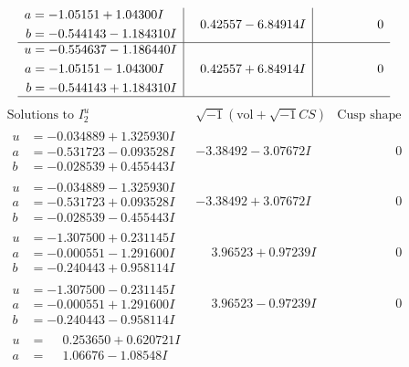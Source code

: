 \documentclass[1p]{elsarticle_modified}
\theoremstyle{definition}
\newcommand{\I}{\sqrt{-1}}
\begin{document}
$$\begin{array}{c|c|c}
\begin{aligned}
a &= -1.05151 + 1.04300 I \\
b &= -0.544143 - 1.184310 I\end{aligned}
 & \phantom{-}0.42557 - 6.84914 I & \phantom{-0.000000 } 0 \\ \hline\begin{aligned}
u &= -0.554637 - 1.186440 I \\
a &= -1.05151 - 1.04300 I \\
b &= -0.544143 + 1.184310 I\end{aligned}
 & \phantom{-}0.42557 + 6.84914 I & \phantom{-0.000000 } 0\\
 \hline 
 \end{array}$$\newpage$$\begin{array}{c|c|c}  
\text{Solutions to }I^u_{2}& \I (\text{vol} + \sqrt{-1}CS) & \text{Cusp shape}\\
 \hline 
\begin{aligned}
u &= -0.034889 + 1.325930 I \\
a &= -0.531723 - 0.093528 I \\
b &= -0.028539 + 0.455443 I\end{aligned}
 & -3.38492 - 3.07672 I & \phantom{-0.000000 } 0 \\ \hline\begin{aligned}
u &= -0.034889 - 1.325930 I \\
a &= -0.531723 + 0.093528 I \\
b &= -0.028539 - 0.455443 I\end{aligned}
 & -3.38492 + 3.07672 I & \phantom{-0.000000 } 0 \\ \hline\begin{aligned}
u &= -1.307500 + 0.231145 I \\
a &= -0.000551 - 1.291600 I \\
b &= -0.240443 + 0.958114 I\end{aligned}
 & \phantom{-}3.96523 + 0.97239 I & \phantom{-0.000000 } 0 \\ \hline\begin{aligned}
u &= -1.307500 - 0.231145 I \\
a &= -0.000551 + 1.291600 I \\
b &= -0.240443 - 0.958114 I\end{aligned}
 & \phantom{-}3.96523 - 0.97239 I & \phantom{-0.000000 } 0 \\ \hline\begin{aligned}
u &= \phantom{-}0.253650 + 0.620721 I \\
a &= \phantom{-}1.06676 - 1.08548 I \\

\end{aligned}
\end{array}$$
\end{document}
